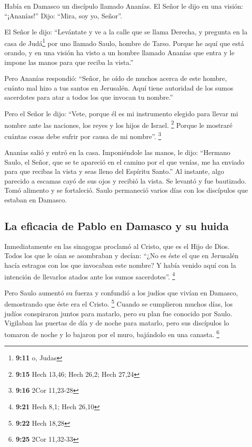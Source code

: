 \begin{paracol}{2}
 Había en Damasco un discípulo llamado Ananías. El Señor
le dijo en una visión: ``¡Ananías!'' Dijo: ``Mira, soy yo, Señor''.

 El Señor le dijo: ``Levántate y ve a la calle que se
llama Derecha, y pregunta en la casa de Judá\footnote{\textbf{9:11} o,
  Judas} por uno llamado Saulo, hombre de Tarso. Porque he aquí que está
orando,  y en una visión ha visto a un hombre llamado
Ananías que entra y le impone las manos para que reciba la vista.''

 Pero Ananías respondió: ``Señor, he oído de muchos
acerca de este hombre, cuánto mal hizo a tus santos en Jerusalén.
 Aquí tiene autoridad de los sumos sacerdotes para atar a
todos los que invocan tu nombre.''

 Pero el Señor le dijo: ``Vete, porque él es mi
instrumento elegido para llevar mi nombre ante las naciones, los reyes y
los hijos de Israel. \footnote{\textbf{9:15} Hech 13,46; Hech 26,2; Hech
  27,24}  Porque le mostraré cuántas cosas debe sufrir
por causa de mi nombre''. \footnote{\textbf{9:16} 2Cor 11,23-28}

 Ananías salió y entró en la casa. Imponiéndole las
manos, le dijo: ``Hermano Saulo, el Señor, que se te apareció en el
camino por el que venías, me ha enviado para que recibas la vista y seas
lleno del Espíritu Santo.''  Al instante, algo parecido a
escamas cayó de sus ojos y recibió la vista. Se levantó y fue bautizado.
 Tomó alimento y se fortaleció. Saulo permaneció varios
días con los discípulos que estaban en Damasco.

\hypertarget{la-eficacia-de-pablo-en-damasco-y-su-huida}{%
\subsection{La eficacia de Pablo en Damasco y su
huida}\label{la-eficacia-de-pablo-en-damasco-y-su-huida}}

 Inmediatamente en las sinagogas proclamó al Cristo, que
es el Hijo de Dios.  Todos los que le oían se asombraban
y decían: ``¿No es éste el que en Jerusalén hacía estragos con los que
invocaban este nombre? Y había venido aquí con la intención de llevarlos
atados ante los sumos sacerdotes''. \footnote{\textbf{9:21} Hech 8,1;
  Hech 26,10}

 Pero Saulo aumentó su fuerza y confundió a los judíos
que vivían en Damasco, demostrando que éste era el Cristo. \footnote{\textbf{9:22}
  Hech 18,28}  Cuando se cumplieron muchos días, los
judíos conspiraron juntos para matarlo,  pero su plan fue
conocido por Saulo. Vigilaban las puertas de día y de noche para
matarlo,  pero sus discípulos lo tomaron de noche y lo
bajaron por el muro, bajándolo en una canasta. \footnote{\textbf{9:25}
  2Cor 11,32-33}


\end{paracol}
